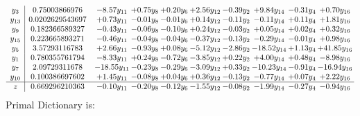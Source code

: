 \documentclass[9pt]{article}
\begin{document}
\[\begin{array}{c| c c@{\hskip 2pt} c@{\hskip 2pt} c@{\hskip 2pt} c@{\hskip 2pt} c@{\hskip 2pt} c@{\hskip 2pt} c@{\hskip 2pt} c@{\hskip 2pt} }
 y_{3}   &  0.75003866976 & -8.57 y_{11} & +  0.75 y_{8} & +  0.20 y_{6} & +  2.56 y_{12} & -0.39 y_{2} & +  9.84 y_{14} & -0.31 y_{4} & +  0.70 y_{16}\\
 y_{13}   &  0.0202629543697 & +  0.73 y_{11} & -0.01 y_{8} & -0.01 y_{6} & +  0.14 y_{12} & -0.11 y_{2} & -0.11 y_{14} & +  0.11 y_{4} & +  1.81 y_{16}\\
 y_{9}   &  0.182366589327 & -0.43 y_{11} & -0.06 y_{8} & -0.10 y_{6} & +  0.24 y_{12} & -0.03 y_{2} & +  0.05 y_{14} & +  0.02 y_{4} & +  0.32 y_{16}\\
 y_{15}   &  0.223665893271 & -0.46 y_{11} & -0.04 y_{8} & -0.04 y_{6} & -0.37 y_{12} & -0.13 y_{2} & -0.29 y_{14} & -0.01 y_{4} & +  0.98 y_{16}\\
 y_{5}   &  3.57293116783 & +  2.66 y_{11} & -0.93 y_{8} & +  0.08 y_{6} & -5.12 y_{12} & -2.86 y_{2} & -18.52 y_{14} & +  1.13 y_{4} & + 41.85 y_{16}\\
 y_{1}   &  0.780355761794 & -8.33 y_{11} & +  0.24 y_{8} & -0.72 y_{6} & -3.85 y_{12} & +  0.22 y_{2} & +  4.00 y_{14} & +  0.48 y_{4} & -8.98 y_{16}\\
 y_{7}   &  2.09729311678 & -18.55 y_{11} & -0.23 y_{8} & -0.29 y_{6} & -3.09 y_{12} & +  0.33 y_{2} & -10.23 y_{14} & -0.91 y_{4} & -16.94 y_{16}\\
 y_{10}   &  0.100386697602 & +  1.45 y_{11} & -0.08 y_{8} & +  0.04 y_{6} & +  0.36 y_{12} & -0.13 y_{2} & -0.77 y_{14} & +  0.07 y_{4} & +  2.22 y_{16}\\
\hline
z    &  0.669296210363 & -0.10 y_{11} & -0.20 y_{8} & -0.12 y_{6} & -1.55 y_{12} & -0.08 y_{2} & -1.99 y_{14} & -0.27 y_{4} & -0.94 y_{16}\\
\end{array}\]
Primal Dictionary is:
\end{document}
